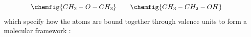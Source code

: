 \documentclass[submitted,12pt]{article}
\providecommand{\DIFdelbegin}{} %
\begin{document}
\begin{equation*}
\chemfig{CH_3-O-CH_3} \quad \quad \chemfig{CH_3-CH_2-OH}\,
\end{equation*}
%
which specify how the atoms are bound together through valence units to form a molecular framework :

\DIFdelbegin %
\end{document}
